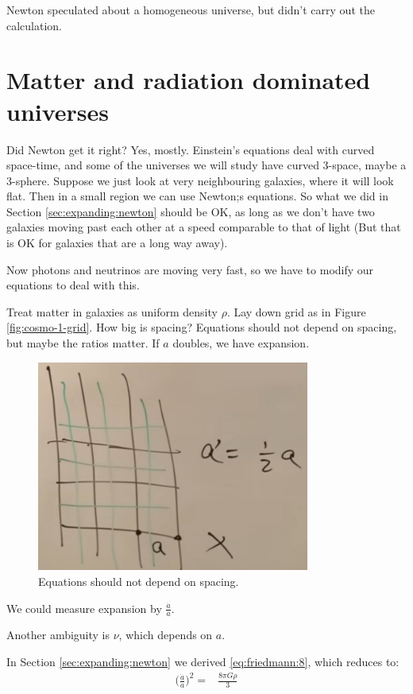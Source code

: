 \documentclass[]{article}
\begin{document}
Newton speculated about a homogeneous universe, but didn't carry out the calculation.

\section{Matter and radiation dominated universes} \label{sec:matter:radiation:dominated}

Did Newton get it right? Yes, mostly. Einstein's equations deal with curved space-time, and some of the universes we will study have curved 3-space, maybe a 3-sphere. Suppose we just look at very neighbouring galaxies, where it will look flat. Then in a small region we can use Newton;s equations. So what we did in Section \ref{sec:expanding:newton} should be OK, as long as we don't have two galaxies moving past each other at a speed comparable to that of light (But that is OK for galaxies that are a long way away).

Now photons and neutrinos are moving very fast, so  we have to modify our equations to deal with this.

Treat matter in galaxies as uniform density $\rho$. Lay down grid as in Figure \ref{fig:cosmo-1-grid}. How big is spacing? Equations should not depend on spacing, but maybe the ratios matter. If $a$ doubles, we have expansion.
\begin{figure}[H]
	\caption{Equations should not depend on spacing.}
	\includegraphics[width=0.8\textwidth]{cosmo-2-grid}
\end{figure}

We could measure expansion by $\frac{\dot{a}}{a}$.

Another ambiguity is $\nu$, which depends on $a$.

In Section \ref{sec:expanding:newton} we derived \eqref{eq:friedmann:8}, which reduces to:
\begin{align*}
	\big(\frac{\dot{a}}{a}\big)^2 =& \frac{8 \pi G \rho}{3}
\end{align*}
\end{document}
